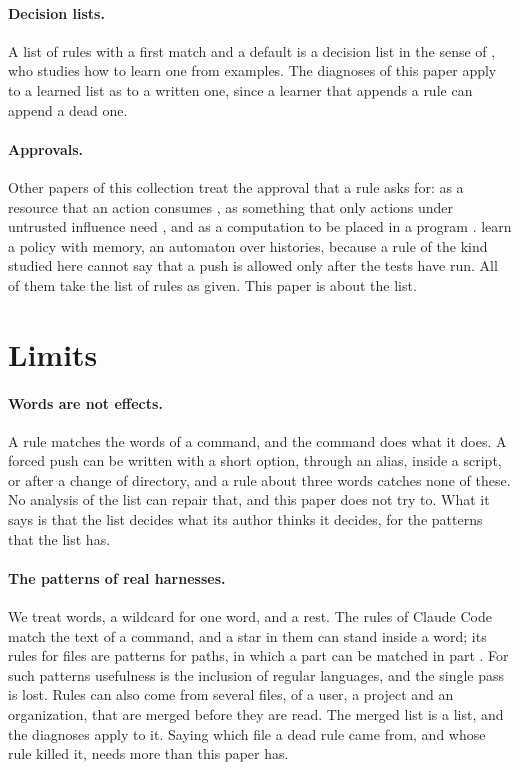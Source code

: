 \documentclass[acmsmall,nonacm,screen]{acmart}
\begin{document}
\paragraph{Decision lists.} A list of rules with a first match and a default is a decision
list in the sense of \citet{Rivest1987}, who studies how to learn one from examples. The
diagnoses of this paper apply to a learned list as to a written one, since a learner that
appends a rule can append a dead one.

\paragraph{Approvals.} Other papers of this collection treat the approval that a rule asks
for: as a resource that an action consumes \citep{tpp4}, as something that only actions under
untrusted influence need \citep{tpp7}, and as a computation to be placed in a program
\citep{tpp17}. \citet{tpp16} learn a policy with memory, an automaton over histories, because
a rule of the kind studied here cannot say that a push is allowed only after the tests have
run. All of them take the list of rules as given. This paper is about the list.

\section{Limits}\label{sec:limits}

\paragraph{Words are not effects.} A rule matches the words of a command, and the command
does what it does. A forced push can be written with a short option, through an alias, inside
a script, or after a change of directory, and a rule about three words catches none of these.
No analysis of the list can repair that, and this paper does not try to. What it says is that
the list decides what its author thinks it decides, for the patterns that the list has.

\paragraph{The patterns of real harnesses.} We treat words, a wildcard for one word, and a
rest. The rules of Claude Code match the text of a command, and a star in them can stand
inside a word; its rules for files are patterns for paths, in which a part can be matched in
part \citep{claudecodepermissions}. For such patterns usefulness is the inclusion of regular
languages, and the single pass is lost. Rules can also come from several files, of a user, a
project and an organization, that are merged before they are read. The merged list is a list,
and the diagnoses apply to it. Saying which file a dead rule came from, and whose rule killed
it, needs more than this paper has.
\end{document}

